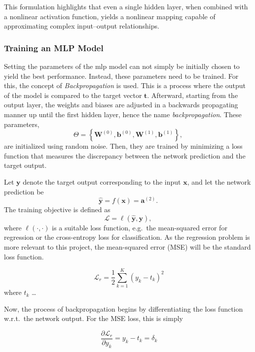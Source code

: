 This formulation highlights that even a single hidden layer, when combined with a nonlinear activation function, yields a nonlinear mapping capable of approximating complex input–output relationships.

\subsubsection{Training an MLP Model}

Setting the parameters of the \gls{mlp} model can not simply be initially chosen to yield the best performance. Instead, these parameters need to be trained. For this, the concept of \emph{Backpropagation} is used. This is a process where the output of the model is compared to the target vector $\mathbf{t}$. Afterward, starting from the output layer, the weights and biases are adjusted in a backwards propagating manner up until the first hidden layer, hence the name \emph{backpropagation}.
These parameters,
\[
\Theta =
\left\{
\mathbf{W}^{(0)}, \mathbf{b}^{(0)},
\mathbf{W}^{(1)}, \mathbf{b}^{(1)}
\right\},
\]
are initialized using random noise.  Then, they are trained by minimizing a loss function that measures the discrepancy between the network prediction and the target output.

Let $\mathbf{y}$ denote the target output corresponding to the input $\mathbf{x}$, and let the network prediction be
\[
\hat{\mathbf{y}} = f(\mathbf{x}) = \mathbf{a}^{(2)}.
\]
The training objective is defined as
\begin{equation}
\label{eq:loss}
\mathcal{L} = \ell(\hat{\mathbf{y}}, \mathbf{y}),
\end{equation}
where $\ell(\cdot,\cdot)$ is a suitable loss function, e.g.\ the mean-squared error for regression or the cross-entropy loss for classification. As the regression problem is more relevant to this project, the mean-squared error (MSE) will be the standard loss function.

\begin{equation}~\label{eq:mlp_mean_squared}
    \mathcal{L}_r = \frac{1}{2} \sum_{k = 1}^{K} (y_k - t_k)^2
\end{equation}
where $t_k$ \ldots

Now, the process of backpropagation begins by differentiating the loss function w.r.t.\ the network output. For the MSE loss, this is simply

\begin{equation}~\label{eq:mlp_loss_derivative}
    \frac{\partial \mathcal{L}_r}{\partial y_k} = y_k - t_k = \delta_k
\end{equation}

